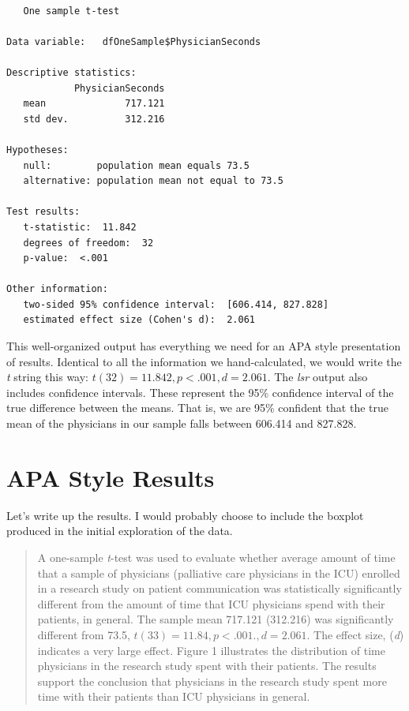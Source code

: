 \documentclass[
  11pt,
]{book}
\begin{document}
\begin{verbatim}

   One sample t-test 

Data variable:   dfOneSample$PhysicianSeconds 

Descriptive statistics: 
            PhysicianSeconds
   mean              717.121
   std dev.          312.216

Hypotheses: 
   null:        population mean equals 73.5 
   alternative: population mean not equal to 73.5 

Test results: 
   t-statistic:  11.842 
   degrees of freedom:  32 
   p-value:  <.001 

Other information: 
   two-sided 95% confidence interval:  [606.414, 827.828] 
   estimated effect size (Cohen's d):  2.061 
\end{verbatim}

This well-organized output has everything we need for an APA style presentation of results. Identical to all the information we hand-calculated, we would write the \emph{t} string this way: \(t(32) = 11.842, p < .001, d = 2.061\). The \emph{lsr} output also includes confidence intervals. These represent the 95\% confidence interval of the true difference between the means. That is, we are 95\% confident that the true mean of the physicians in our sample falls between 606.414 and 827.828.

\hypertarget{apa-style-results}{%
\section{APA Style Results}\label{apa-style-results}}

Let's write up the results. I would probably choose to include the boxplot produced in the initial exploration of the data.

\begin{quote}
A one-sample \emph{t}-test was used to evaluate whether average amount of time that a sample of physicians (palliative care physicians in the ICU) enrolled in a research study on patient communication was statistically significantly different from the amount of time that ICU physicians spend with their patients, in general. The sample mean 717.121 (312.216) was significantly different from 73.5, \(t(33) = 11.84, p < .001., d = 2.061\). The effect size, (\emph{d}) indicates a very large effect. Figure 1 illustrates the distribution of time physicians in the research study spent with their patients. The results support the conclusion that physicians in the research study spent more time with their patients than ICU physicians in general.
\end{quote}
\end{document}
